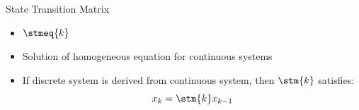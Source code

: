 \begin{frame}
State Transition Matrix
 \begin{itemize}
 \item $\stmeq{k}$
 \item Solution of homogeneous equation for continuous systems
 \item If discrete system is derived from continuous system, then $\stm{k}$ satisfies:
\[x_k=\stm{k}x_{k-1}\]
\end{itemize}
\end{frame}
